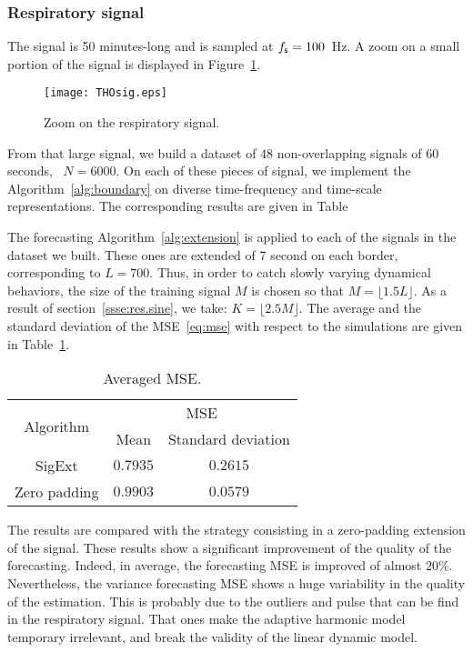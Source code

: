 \subsubsection{Respiratory signal}

The signal is 50 minutes-long and is sampled at $f_{\mathsf s}=100$~Hz. A zoom on a small portion of the signal is displayed in Figure~\ref{fig:tho}.

\begin{figure}
\texttt{[image: THOsig.eps]}
\caption{Zoom on the respiratory signal.}
\label{fig:tho}
\end{figure}

From that large signal, we build a dataset of $48$ non-overlapping signals of 60 seconds, \ie~$N=6000$. On each of these pieces of signal, we implement the Algorithm~\ref{alg:boundary} on diverse time-frequency and time-scale representations. The corresponding results are given in Table~ 

The forecasting Algorithm~\ref{alg:extension} is applied to each of the signals in the dataset we built. These ones are extended of 7 second on each border, corresponding to $L =700$. Thus, in order to catch slowly varying dynamical behaviors, the size of the training signal $M$ is chosen so that $M=\lfloor 1.5L\rfloor$. As a result of section~\ref{ssse:res.sine}, we take: $K=\lfloor2.5M\rfloor$. The average and the standard deviation of the MSE~\ref{eq:mse} with respect to the simulations are given in Table~\ref{tab:mse}.

\begin{table}
\centering
\caption{Averaged MSE.}
\begin{tabular}{|c||c|c|}
  \hline
   \multirow{2}{*}{Algorithm} & \multicolumn{2}{c|}{MSE} \\
   \cline{2-3}
      & Mean & Standard deviation\\
   \hhline{|=#=|=|}
   {\sf SigExt} & $0.7935$ & $0.2615$ \\
   \hline
   Zero padding & $0.9903$ & $0.0579$ \\
   \hline
\end{tabular}
\label{tab:mse}
\end{table} 

The results are compared with the strategy consisting in a zero-padding extension of the signal. These results  show a significant improvement of the quality of the forecasting. Indeed, in average, the forecasting MSE is improved of almost $20\%$. Nevertheless, the variance forecasting MSE shows a huge variability in the quality of the estimation. This is probably due to the outliers and pulse that can be find in the respiratory signal. That ones make the adaptive harmonic model temporary irrelevant, and break the validity of the linear dynamic model.


